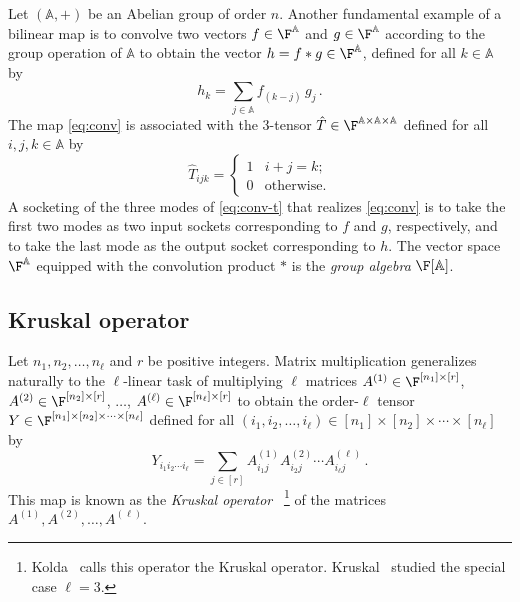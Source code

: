 Let $(\mathbb{A},+)$ be an Abelian group of order $n$.
Another fundamental example of a bilinear map is to convolve
two vectors $f\in\F^{\mathbb{A}}$ and $g\in\F^{\mathbb{A}}$ according to the
group operation of $\mathbb{A}$ to obtain
the vector $h=f*g\in\F^{\mathbb{A}}$, defined for all $k\in \mathbb{A}$ by
\begin{equation}
\label{eq:conv}
h_k=\sum_{j\in \mathbb{A}}f_{(k-j)}\,g_j\,.
\end{equation}
The map \eqref{eq:conv} is associated with the $3$-tensor
$\hat{T}\in\F^{\mathbb{A}\times\mathbb{A}\times\mathbb{A}}$ defined for all
$i,j,k\in \mathbb{A}$ by
\begin{equation}
\label{eq:conv-t}
\hat{T}_{ijk}=
\begin{cases}
1 & \text{$i+j=k$};\\
0 & \text{otherwise}.
\end{cases}
\end{equation}
A socketing of the three modes of \eqref{eq:conv-t} that
realizes \eqref{eq:conv}
is to take the first two modes as two input sockets corresponding
to $f$ and $g$, respectively, and to take the last mode as the
output socket corresponding to $h$. The vector space
%
%
$\F^{\mathbb{A}}$  %
equipped with the convolution product $*$ is the
\emph{group algebra} $\F[\mathbb{A}]$.


\subsection{Kruskal operator}
\label{sect:kruskal}

Let $n_1,n_2,\ldots,n_\ell$ and $r$ be positive integers.
Matrix multiplication generalizes naturally to the $\ell$-linear task
of multiplying $\ell$ matrices
$A^{(1)}\in\F^{[n_1]\times [r]}$,
$A^{(2)}\in\F^{[n_2]\times [r]}$,
$\ldots$,
$A^{(\ell)}\in\F^{[n_\ell]\times [r]}$
to obtain the order-$\ell$ tensor
$Y\in\F^{[n_1]\times [n_2]\times \cdots\times [n_\ell]}$
defined for all
$(i_1,i_2,\ldots,i_\ell)\in[n_1]\times[n_2]\times\cdots\times[n_\ell]$ by
\begin{equation}
\label{eq:kruskal}
Y_{i_1i_2\cdots i_\ell}
=\sum_{j\in [r]} A^{(1)}_{i_1j}A^{(2)}_{i_2j}\cdots A^{(\ell)}_{i_\ell j}\,.
\end{equation}
%
%
%
This map 
%
is known as the \emph{Kruskal operator}~\cite{Kruskal1977,Kolda2006}%
\footnote{Kolda~\cite{Kolda2006} calls this operator the Kruskal operator.
Kruskal~\cite{Kruskal1977} studied %
%
%
%
the special case $\ell = 3$.}{}
%
of the matrices $A^{(1)},A^{(2)},\ldots,A^{(\ell)}$.

